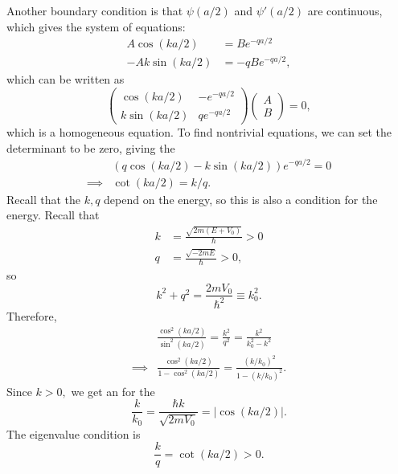 \documentclass{article}
\numberwithin{equation}{section}
\begin{document}
Another boundary condition is that $\psi(a/2)$ and $\psi'(a/2)$ are continuous, which gives the system of equations:
\begin{align*}
    A\cos(ka/2) &= Be^{-qa/2} \\ 
    -Ak\sin(ka/2) &= -qBe^{-qa/2},
\end{align*}
which can be written as 
\begin{equation*}
    \begin{pmatrix}
        \cos(ka/2) & -e^{-qa/2} \\ 
        k\sin(ka/2) & qe^{-qa/2}
    \end{pmatrix}\begin{pmatrix}
        A \\ B
    \end{pmatrix} = 0,
\end{equation*}
which is a homogeneous equation. To find nontrivial equations, we can set the determinant to be zero, giving  the 
\begin{align*}
    & (q\cos(ka/2) - k\sin(ka/2))e^{-qa/2} = 0 \\ 
\implies & \boxed{\cot(ka/2) = k/q}.
\end{align*}
Recall that the $k,q$ depend on the energy, so this is also a condition for the energy. Recall that
\begin{align*}
    k &= \frac{\sqrt{2m(E+V_0)}}{\hbar} > 0  \\
    q &= \frac{\sqrt{-2mE}}{\hbar} > 0,
\end{align*}
so
\begin{equation*}
    k^2 + q^2 = \frac{2mV_0}{\hbar^2} \equiv k_0^2.
\end{equation*}
Therefore,
\begin{align*}
    & \frac{\cos^2(ka/2)}{\sin^2(ka/2)} = \frac{k^2}{q^2} = \frac{k^2}{k_0^2-k^2} \\ 
    \implies & \frac{\cos^2(ka/2)}{1-\cos^2(ka/2)} = \frac{(k/k_0)^2}{1-(k/k_0)^2}.
\end{align*}
Since $k>0,$ we get an  for the 
\begin{equation*}
    \frac{k}{k_0} = \frac{\hbar k}{\sqrt{2mV_0}}= |\cos(ka/2)|.
\end{equation*}
The eigenvalue condition is 
\begin{equation*}
    \frac{k}{q} = \cot(ka/2) > 0.
\end{equation*}
\end{document}
